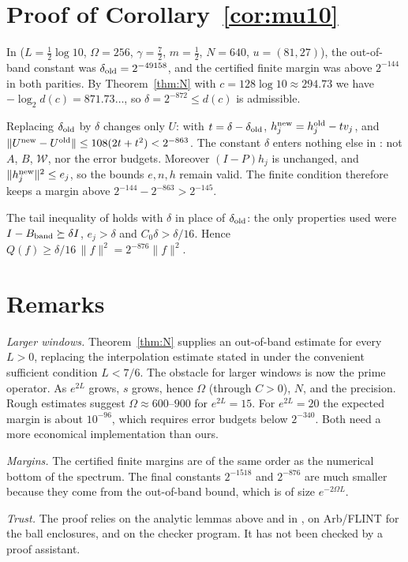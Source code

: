 \documentclass[11pt]{amsart}
\theoremstyle{remark}
\numberwithin{equation}{section}
\begin{document}
\section{Proof of Corollary~\ref{cor:mu10}}\label{sec:mu10}
In \cite{MoriVI} ($L=\frac12\log10$, $\Omega=256$, $\gamma=\frac72$, $m=\frac12$, $N=640$, $u=(81,27)$), the out-of-band constant was $\delta_{\rm old}=2^{-49158}$, and the certified finite margin was above $2^{-144}$ in both parities. By Theorem~\ref{thm:N} with $c=128\log10\approx294.73$ we have $-\log_2d(c)=871.73\ldots$, so $\delta=2^{-872}\le d(c)$ is admissible.

Replacing $\delta_{\rm old}$ by $\delta$ changes only $U$: with $t=\delta-\delta_{\rm old}$, $h_j^{\rm new}=h_j^{\rm old}-tv_j$, and $\|U^{\rm new}-U^{\rm old}\|\le108(2t+t^2)<2^{-863}$. The constant $\delta$ enters nothing else in \cite{MoriVI}: not $A$, $B$, $\mathcal W$, nor the error budgets. Moreover $(I-P)h_j$ is unchanged, and $\|h_j^{\rm new}\|^2\le e_j$, so the bounds $e,n,h$ remain valid. The finite condition therefore keeps a margin above $2^{-144}-2^{-863}>2^{-145}$.

The tail inequality of \cite[Proposition~3.4]{MoriVI} holds with $\delta$ in place of $\delta_{\rm old}$: the only properties used were $I-B_{\rm band}\succeq\delta I$, $e_j>\delta$ and $C_0\delta>\delta/16$. Hence $Q(f)\ge\delta/16\,\|f\|^2=2^{-876}\|f\|^2$.

\section{Remarks}
\emph{Larger windows.} Theorem~\ref{thm:N} supplies an out-of-band estimate for every $L>0$, replacing the interpolation estimate stated in \cite{MoriVI} under the convenient sufficient condition $L<7/6$. The obstacle for larger windows is now the prime operator. As $e^{2L}$ grows, $s$ grows, hence $\Omega$ (through $C>0$), $N$, and the precision. Rough estimates suggest $\Omega\approx600$--$900$ for $e^{2L}=15$. For $e^{2L}=20$ the expected margin is about $10^{-96}$, which requires error budgets below $2^{-340}$. Both need a more economical implementation than ours.

\emph{Margins.} The certified finite margins are of the same order as the numerical bottom of the spectrum. The final constants $2^{-1518}$ and $2^{-876}$ are much smaller because they come from the out-of-band bound, which is of size $e^{-2\Omega L}$.

\emph{Trust.} The proof relies on the analytic lemmas above and in \cite{MoriVI}, on Arb/FLINT \cite{Arb} for the ball enclosures, and on the checker program. It has not been checked by a proof assistant.
\end{document}
